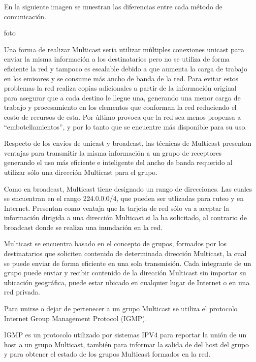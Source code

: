 \documentclass[12pt,a4paper,oneside]{book}
\begin{document}
En la siguiente imagen se muestran las diferencias entre cada método de comunicación.

foto

Una forma de realizar Multicast sería utilizar múltiples conexiones unicast para enviar la misma información a los destinatarios pero no se utiliza de forma eficiente la red y tampoco es escalable debido a que aumenta la carga de trabajo en los emisores y se consume más ancho de banda de la red. Para evitar estos problemas la red realiza copias adicionales a partir de la información original para asegurar que a cada destino le llegue una, generando una menor carga de trabajo y procesamiento en los elementos que conforman la red reduciendo el costo de recursos de esta. Por último provoca que la red sea menos propensa a “embotellamientos”, y por lo tanto que se encuentre más disponible para su uso. 

	Respecto de los envíos de unicast y broadcast, las técnicas de Multicast presentan ventajas para transmitir la misma información a un grupo de receptores generando el uso más eficiente e inteligente del ancho de banda requerido al utilizar sólo una dirección Multicast para el grupo. 



Como en broadcast, Multicast tiene designado un rango de direcciones. Las cuales se encuentran en el rango 224.0.0.0/4, que pueden ser utlizadas para ruteo y en Internet. Presentan como ventaja que la tarjeta de red sólo va a aceptar la información dirigida a una dirección Multicast si la ha solicitado, al contrario de broadcast donde se realiza una inundación en la red.

	Multicast se encuentra basado en el concepto de grupos, formados por los destinatarios que soliciten contenido de determinada dirección Multicast, la cual se puede enviar de forma eficiente en una sola transmisión. Cada integrante de un grupo puede enviar y recibir contenido de la dirección Multicast sin importar su ubicación geográfica, puede estar ubicado en cualquier lugar de Internet o en una red privada.
	
Para unirse o dejar de pertenecer a un grupo Multicast se utiliza el protocolo Internet Group Management Protocol (IGMP). 

IGMP es un protocolo utilizado por sistemas IPV4 para reportar la unión de un host a un grupo Multicast, también para informar la salida de del host del grupo y para obtener el estado de los grupos Multicast formados en la red.
\end{document}
